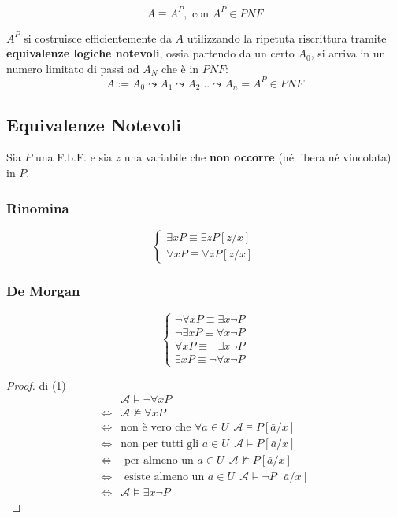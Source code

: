 $$
A \equiv A^P, \text{ con } A^P \in PNF
$$

$A^P$ si costruisce efficientemente da $A$ utilizzando la ripetuta riscrittura tramite 
\textbf{equivalenze logiche notevoli}, ossia partendo da un certo 
$A_0$, si arriva in un numero limitato di passi ad $A_N$ che è in $PNF$: 
$$
A := A_0 \leadsto A_1 \leadsto A_2 \ldots \leadsto A_n = A^P \in PNF
$$

\subsection{Equivalenze Notevoli}
Sia $P$ una F.b.F. e sia $z$ una variabile che \textbf{non occorre} (né libera 
né vincolata) in $P$. 

\subsubsection{Rinomina}
\label{rinomina}
\[
\begin{cases}
  \exists x P \equiv \exists z P[z/x] \\
  \forall x P \equiv \forall z P[z/x]
\end{cases}
\]
\subsubsection{De Morgan}
\[
\begin{cases}
  \neg \forall x P \equiv \exists x \neg P \\
  \neg \exists x P \equiv \forall x \neg P \\
  \forall x P \equiv \neg \exists x \neg P \\
  \exists x P \equiv \neg \forall x \neg P
\end{cases}
\]
\begin{proof}{di (1)}
  \begin{align*}
    & \mathscr{A} \models \neg \forall x P \\
    \iff & \mathscr{A} \nvDash \forall x P \\
    \iff & \text{non è vero che } \forall a \in U ~~ \mathscr{A} \models P[\bar{a}/x] \\
    \iff & \text{non per tutti gli } a \in U ~~ \mathscr{A} \models P[\bar{a}/x] \\
    \iff & \text{ per almeno un } a \in U ~~ \mathscr{A} \nvDash P[\bar{a}/x] \\
    \iff & \text{ esiste almeno un } a \in U ~~ \mathscr{A} \models \neg P[\bar{a}/x] \\
    \iff & \mathscr{A} \models \exists x \neg P 
  \end{align*}
\end{proof}

